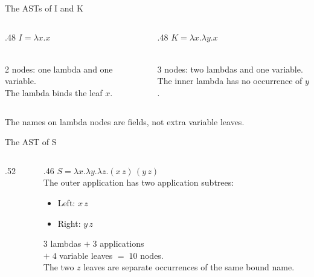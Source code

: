 \documentclass[aspectratio=169,11pt]{beamer}
\begin{document}
\begin{frame}{The ASTs of I and K}
\begin{columns}[T]
\begin{column}{.48\textwidth}\centering
$I=\lambda x.x$\\[1em]
\\[1em]
2 nodes: one lambda and one variable.\\[.6em]
The lambda binds the leaf $x$.
\end{column}
\begin{column}{.48\textwidth}\centering
$K=\lambda x.\lambda y.x$\\[1em]
\\[1em]
3 nodes: two lambdas and one variable.\\[.6em]
The inner lambda has no occurrence of $y$.
\end{column}
\end{columns}
\vfill
The names on lambda nodes are fields, not extra variable leaves.
\end{frame}

\begin{frame}{The AST of S}
\begin{columns}[c]
\begin{column}{.52\textwidth}\centering
{}
\end{column}
\begin{column}{.46\textwidth}
$S=\lambda x.\lambda y.\lambda z.(x\,z)\,(y\,z)$\\[1.2em]
The outer application has two application subtrees:
\begin{itemize}
\item Left: $x\,z$
\item Right: $y\,z$
\end{itemize}
\medskip
$3$ lambdas $+\;3$ applications\\
$+\;4$ variable leaves $=\;10$ nodes.\\[1em]
The two $z$ leaves are separate occurrences of the same bound name.
\end{column}
\end{columns}
\end{frame}
\end{document}
